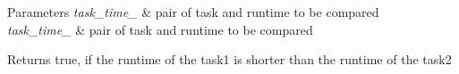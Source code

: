\begin{DoxyParams}{Parameters}
{\em task\+\_\+time\+\_} & pair of task and runtime to be compared \\
\hline
{\em task\+\_\+time\+\_} & pair of task and runtime to be compared\\
\hline
\end{DoxyParams}
\begin{DoxyReturn}{Returns}
true, if the runtime of the task1 is shorter than the runtime of the task2 
\end{DoxyReturn}

